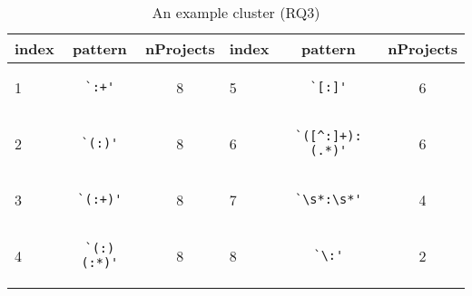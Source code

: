 
\begin{table}
\begin{center}
\caption{An example cluster (RQ3)}
\label{table:exampleCluster}
\begin{small}
\begin{tabular}
{lcc | lcc}
\toprule
index & pattern & nProjects & index & pattern & nProjects \\
\midrule
1 & \begin{minipage}{0.3in}\begin{verbatim}`:+'\end{verbatim}\end{minipage} & 8 & 5 & \begin{minipage}{0.5in}\begin{verbatim}`[:]'\end{verbatim}\end{minipage} & 6 \\
\midrule
2 & \begin{minipage}{0.3in}\begin{verbatim}`(:)'\end{verbatim}\end{minipage} & 8 & 6 & \begin{minipage}{0.6in}\begin{verbatim}`([^:]+):(.*)'\end{verbatim}\end{minipage} & 6 \\
\midrule
3 & \begin{minipage}{0.3in}\begin{verbatim}`(:+)'\end{verbatim}\end{minipage} & 8 & 7 & \begin{minipage}{0.5in}\begin{verbatim}`\s*:\s*'\end{verbatim}\end{minipage} & 4 \\
\midrule
4 & \begin{minipage}{0.3in}\begin{verbatim}`(:)(:*)'\end{verbatim}\end{minipage} & 8 & 8 & \begin{minipage}{0.5in}\begin{verbatim}`\:'\end{verbatim}\end{minipage} & 2 \\

\bottomrule
\end{tabular}
\end{small}
\end{center}
\end{table}


